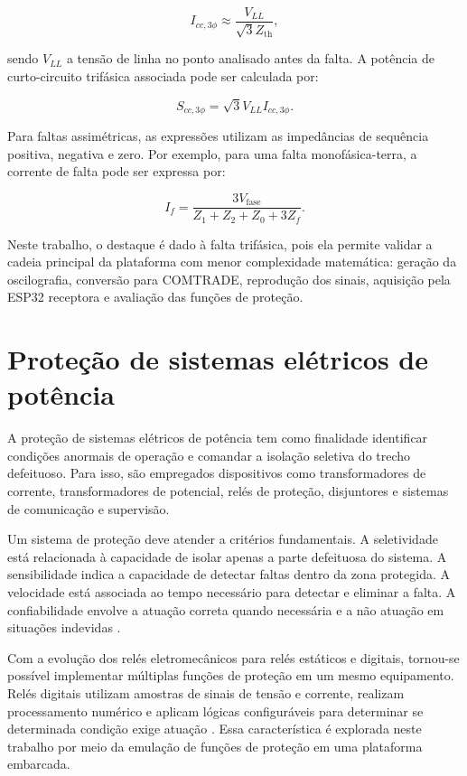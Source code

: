 \begin{equation}
  I_{cc,3\phi} \approx \frac{V_{LL}}{\sqrt{3}Z_{\text{th}}},
  \label{eq:icc-solido}
\end{equation}

\noindent sendo $V_{LL}$ a tensão de linha no ponto analisado antes da falta. A potência de curto-circuito trifásica associada pode ser calculada por:

\begin{equation}
  S_{cc,3\phi} = \sqrt{3}V_{LL}I_{cc,3\phi}.
  \label{eq:scc}
\end{equation}

Para faltas assimétricas, as expressões utilizam as impedâncias de sequência positiva, negativa e zero. Por exemplo, para uma falta monofásica-terra, a corrente de falta pode ser expressa por:

\begin{equation}
  I_f = \frac{3V_{\text{fase}}}{Z_1 + Z_2 + Z_0 + 3Z_f}.
  \label{eq:falta-monofasica}
\end{equation}

Neste trabalho, o destaque é dado à falta trifásica, pois ela permite validar a cadeia principal da plataforma com menor complexidade matemática: geração da oscilografia, conversão para COMTRADE, reprodução dos sinais, aquisição pela ESP32 receptora e avaliação das funções de proteção.

\section{Proteção de sistemas elétricos de potência}

A proteção de sistemas elétricos de potência tem como finalidade identificar condições anormais de operação e comandar a isolação seletiva do trecho defeituoso. Para isso, são empregados dispositivos como transformadores de corrente, transformadores de potencial, relés de proteção, disjuntores e sistemas de comunicação e supervisão.

Um sistema de proteção deve atender a critérios fundamentais. A seletividade está relacionada à capacidade de isolar apenas a parte defeituosa do sistema. A sensibilidade indica a capacidade de detectar faltas dentro da zona protegida. A velocidade está associada ao tempo necessário para detectar e eliminar a falta. A confiabilidade envolve a atuação correta quando necessária e a não atuação em situações indevidas \cite{anderson1999power,horowitz2014power}.

Com a evolução dos relés eletromecânicos para relés estáticos e digitais, tornou-se possível implementar múltiplas funções de proteção em um mesmo equipamento. Relés digitais utilizam amostras de sinais de tensão e corrente, realizam processamento numérico e aplicam lógicas configuráveis para determinar se determinada condição exige atuação \cite{phadke2009computer}. Essa característica é explorada neste trabalho por meio da emulação de funções de proteção em uma plataforma embarcada.

